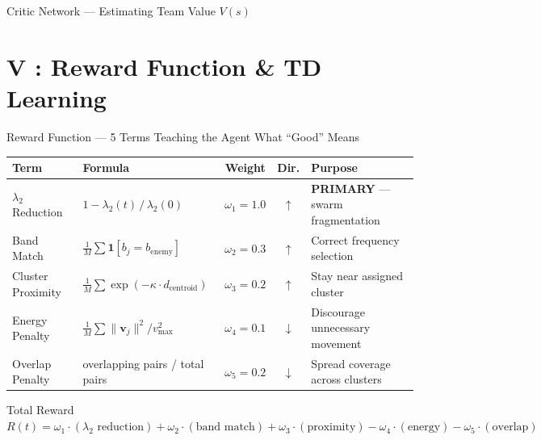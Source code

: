 \documentclass[10pt, aspectratio=169]{beamer}
\begin{document}
\begin{frame}{Critic Network --- Estimating Team Value $V(s)$}
\begin{center}
\end{center}
\end{frame}

\section{V : Reward Function \& TD Learning}\label{sec:training}

\begin{frame}{Reward Function --- 5 Terms Teaching the Agent What ``Good'' Means}
\vspace{-0.1cm}
\begin{center}
\footnotesize
\renewcommand{\arraystretch}{1.3}
\setlength{\tabcolsep}{3pt}
\begin{tabular}{|l|l|c|c|p{3.8cm}|}
\hline
\rowcolor{MARLBlue!15}
\textbf{Term} & \textbf{Formula} & \textbf{Weight} & \textbf{Dir.} & \textbf{Purpose} \\
\hline
$\lambda_2$ Reduction & $1 - \lambda_2(t)\,/\,\lambda_2(0)$ & $\omega_1 = 1.0$ & $\uparrow$ & \textbf{PRIMARY} --- swarm fragmentation \\
\hline
Band Match & $\frac{1}{M}\sum \mathbf{1}[b_j = b_{\text{enemy}}]$ & $\omega_2 = 0.3$ & $\uparrow$ & Correct frequency selection \\
\hline
Cluster Proximity & $\frac{1}{M}\sum \exp\!\left(-\kappa \cdot d_{\text{centroid}}\right)$ & $\omega_3 = 0.2$ & $\uparrow$ & Stay near assigned cluster \\
\hline
Energy Penalty & $\frac{1}{M}\sum \|\mathbf{v}_j\|^2 / v_{\max}^2$ & $\omega_4 = 0.1$ & $\downarrow$ & Discourage unnecessary movement \\
\hline
Overlap Penalty & overlapping pairs / total pairs & $\omega_5 = 0.2$ & $\downarrow$ & Spread coverage across clusters \\
\hline
\end{tabular}
\end{center}

\vspace{0.3cm}
\begin{block}{Total Reward}
  \centering
  $R(t) = \omega_1 \cdot (\lambda_2\text{ reduction}) + \omega_2 \cdot (\text{band match}) + \omega_3 \cdot (\text{proximity}) - \omega_4 \cdot (\text{energy}) - \omega_5 \cdot (\text{overlap})$
\end{block}
\end{frame}
\end{document}
